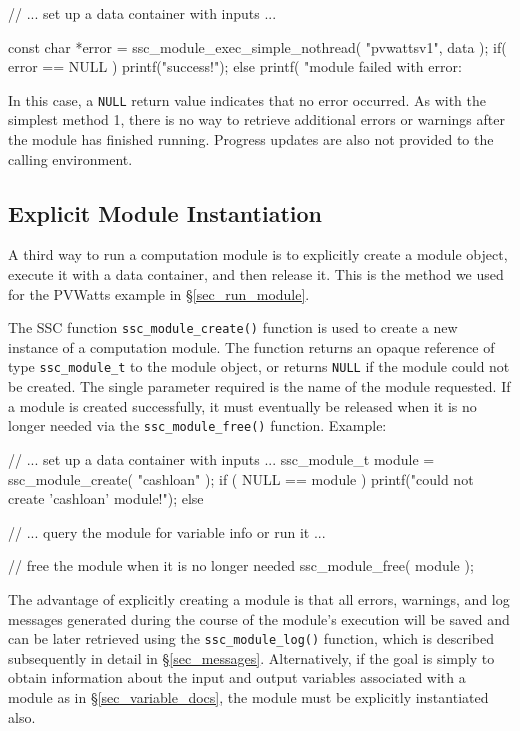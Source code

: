 \documentclass{article}
\begin{document}
\begin{verbatimtab}[4]
// ... set up a data container with inputs ...

const char *error = ssc_module_exec_simple_nothread( "pvwattsv1", data );
if( error == NULL )
	printf("success!\n");
else
	printf( "module failed with error: %
\end{verbatimtab}

In this case, a \texttt{NULL} return value indicates that no error occurred.  As with the simplest method 1, there is no way to retrieve additional errors or warnings after the module has finished running.  Progress updates are also not provided to the calling environment.

\subsection{Explicit Module Instantiation}
\label{sec_explicit_modules}

A third way to run a computation module is to explicitly create a module object, execute it with a data container, and then release it.  This is the method we used for the PVWatts example in \S\ref{sec_run_module}.

The SSC function \texttt{ssc\_module\_create()} function is used to create a new instance of a computation module.  The function returns an opaque reference of type \texttt{ssc\_module\_t} to the module object, or returns \texttt{NULL} if the module could not be created.  The single parameter required is the name of the module requested.  If a module is created successfully, it must eventually be released when it is no longer needed via the \texttt{ssc\_module\_free()} function.  Example:

\begin{verbatimtab}[4]
// ... set up a data container with inputs ...
ssc_module_t module = ssc_module_create( "cashloan" );
if ( NULL == module )
	printf("could not create 'cashloan' module!\n");
else
{
	// ... query the module for variable info or run it ...

	// free the module when it is no longer needed
	ssc_module_free( module );
}
\end{verbatimtab}

The advantage of explicitly creating a module is that all errors, warnings, and log messages generated during the course of the module's execution will be saved and can be later retrieved using the \texttt{ssc\_module\_log()} function, which is described subsequently in detail in \S\ref{sec_messages}.  Alternatively, if the goal is simply to obtain information about the input and output variables associated with a module as in \S\ref{sec_variable_docs}, the module must be explicitly instantiated also.
\end{document}

